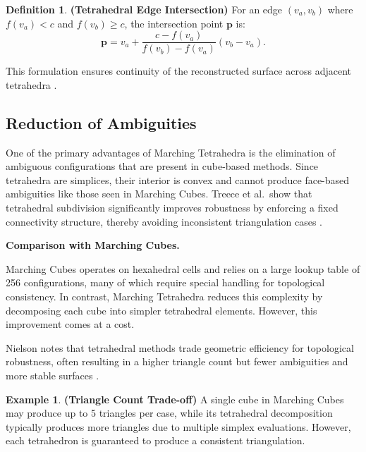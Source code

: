 \documentclass[12pt, a4paper, oneside]{book}
\theoremstyle{plain}
\theoremstyle{definition}
\newtheorem{definition}[theorem]{Definition}
\newtheorem{example}[theorem]{Example}
\theoremstyle{remark}
\theoremstyle{definition}
\begin{document}
\begin{definition}
    \textbf{(Tetrahedral Edge Intersection)}
For an edge $(v_a, v_b)$ where $f(v_a) < c$ and $f(v_b) \geq c$, the intersection point
$\mathbf{p}$ is:
\[
\mathbf{p} = v_a + \frac{c - f(v_a)}{f(v_b) - f(v_a)} (v_b - v_a).
\]
\end{definition}

This formulation ensures continuity of the reconstructed surface across adjacent
tetrahedra \cite{bloomenthal1997introduction}.

\vspace{0.5em}

\subsection{Reduction of Ambiguities}

One of the primary advantages of Marching Tetrahedra is the elimination of ambiguous
configurations that are present in cube-based methods. Since tetrahedra are simplices,
their interior is convex and cannot produce face-based ambiguities like those seen in
Marching Cubes. Treece et al.\ show that tetrahedral subdivision significantly improves
robustness by enforcing a fixed connectivity structure, thereby avoiding inconsistent
triangulation cases \cite{treece1999regularised}.

\vspace{0.5em}

\textbf{Comparison with Marching Cubes.}

Marching Cubes operates on hexahedral cells and relies on a large lookup table of 256
configurations, many of which require special handling for topological consistency. In
contrast, Marching Tetrahedra reduces this complexity by decomposing each cube into
simpler tetrahedral elements. However, this improvement comes at a cost.

Nielson notes that tetrahedral methods trade geometric efficiency for topological
robustness, often resulting in a higher triangle count but fewer ambiguities and more
stable surfaces \cite{nielson2008dual}.

\begin{example}
    \textbf{(Triangle Count Trade-off)}
A single cube in Marching Cubes may produce up to 5 triangles per case, while its
tetrahedral decomposition typically produces more triangles due to multiple simplex
evaluations. However, each tetrahedron is guaranteed to produce a consistent
triangulation.
\end{example}
\end{document}
